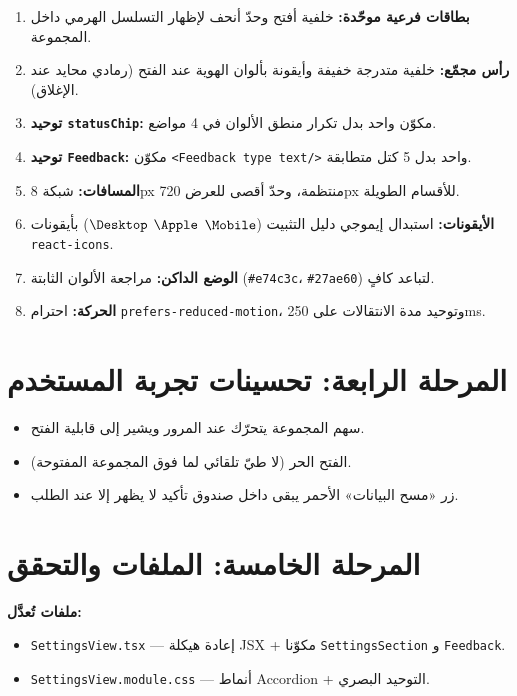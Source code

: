 \documentclass[11pt]{article}
\begin{document}
\begin{enumerate}
  \item \textbf{بطاقات فرعية موحّدة:} خلفية أفتح وحدّ أنحف لإظهار التسلسل الهرمي داخل المجموعة.
  \item \textbf{رأس مجمّع:} خلفية متدرجة خفيفة وأيقونة بألوان الهوية عند الفتح (رمادي محايد عند الإغلاق).
  \item \textbf{توحيد \texttt{statusChip}:} مكوّن واحد بدل تكرار منطق الألوان في 4 مواضع.
  \item \textbf{توحيد \texttt{Feedback}:} مكوّن \texttt{<Feedback type text/>} واحد بدل 5 كتل متطابقة.
  \item \textbf{المسافات:} شبكة 8px منتظمة، وحدّ أقصى للعرض 720px للأقسام الطويلة.
  \item \textbf{الأيقونات:} استبدال إيموجي دليل التثبيت ($\Mobile$ $\Apple$ $\Desktop$) بأيقونات \texttt{react-icons}.
  \item \textbf{الوضع الداكن:} مراجعة الألوان الثابتة (\texttt{\#e74c3c}، \texttt{\#27ae60}) لتباعد كافٍ.
  \item \textbf{الحركة:} احترام \texttt{prefers-reduced-motion}، وتوحيد مدة الانتقالات على 250ms.
\end{enumerate}

\section{المرحلة الرابعة: تحسينات تجربة المستخدم}

\begin{itemize}
  \item سهم المجموعة يتحرّك عند المرور ويشير إلى قابلية الفتح.
  \item الفتح الحر (لا طيّ تلقائي لما فوق المجموعة المفتوحة).
  \item زر «مسح البيانات» الأحمر يبقى داخل صندوق تأكيد لا يظهر إلا عند الطلب.
\end{itemize}

\section{المرحلة الخامسة: الملفات والتحقق}

\textbf{ملفات تُعدَّل:}
\begin{itemize}
  \item \texttt{SettingsView.tsx} — إعادة هيكلة JSX + مكوّنا \texttt{SettingsSection} و \texttt{Feedback}.
  \item \texttt{SettingsView.module.css} — أنماط Accordion + التوحيد البصري.
\end{itemize}
\end{document}
